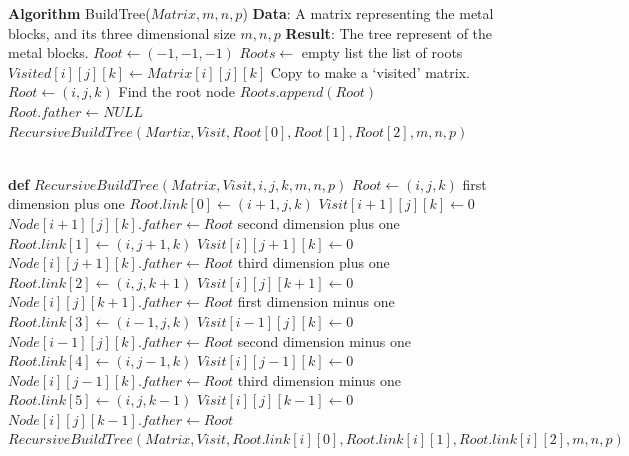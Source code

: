 \documentclass[11pt]{article}
\begin{document}
\begin{algorithmic}
	\State \textbf{Algorithm} BuildTree($Matrix,m,n,p$)
	\State \textbf{Data}: A matrix representing the metal blocks, and its three dimensional size $m,n,p$
	\State \textbf{Result}: The tree represent of the metal blocks.
	\State $Root\gets (-1,-1,-1)$
	\State $Roots\gets$ empty list \Comment the list of roots
				\State $Visited[i][j][k] \gets Matrix[i][j][k]$ \Comment Copy to make a `visited' matrix.
					\State $Root \gets (i,j,k)$ \Comment Find the root node
					\State $Roots.append(Root)$
					\State $Root.father \gets NULL$
					\State $RecursiveBuildTree(Martix,Visit,Root[0],Root[1],Root[2],m,n,p)$
				\EndIf
			\EndFor
		\EndFor
	\EndFor

\\
	\State \textbf{def} $RecursiveBuildTree(Matrix,Visit,i,j,k,m,n,p)$
	\State $Root \gets(i,j,k)$
		 \Comment first dimension plus one
			\State $Root.link[0] \gets (i+1,j,k)$
			\State $Visit[i+1][j][k]\gets 0$
			\State $Node[i+1][j][k].father \gets Root$
		\EndIf
	\EndIf
		 \Comment second dimension plus one
			\State $Root.link[1] \gets (i,j+1,k)$
			\State $Visit[i][j+1][k]\gets 0$
			\State $Node[i][j+1][k].father \gets Root$
		\EndIf
	\EndIf
		 \Comment third dimension plus one
			\State $Root.link[2] \gets (i,j,k+1)$
			\State $Visit[i][j][k+1]\gets 0$
			\State $Node[i][j][k+1].father \gets Root$
		\EndIf
	\EndIf
		 \Comment first dimension minus one
			\State $Root.link[3] \gets (i-1,j,k)$
			\State $Visit[i-1][j][k]\gets 0$
			\State $Node[i-1][j][k].father \gets Root$
		\EndIf
	\EndIf
		 \Comment second dimension minus one
			\State $Root.link[4] \gets (i,j-1,k)$
			\State $Visit[i][j-1][k]\gets 0$
			\State $Node[i][j-1][k].father \gets Root$
		\EndIf
	\EndIf
		 \Comment third dimension minus one
			\State $Root.link[5] \gets (i,j,k-1)$
			\State $Visit[i][j][k-1]\gets 0$
			\State $Node[i][j][k-1].father \gets Root$
		\EndIf
	\EndIf
			\State $RecursiveBuildTree(Matrix,Visit,Root.link[i][0],Root.link[i][1],Root.link[i][2],m,n,p)$
		\EndIf
	\EndFor
\end{algorithmic}
\end{document}
